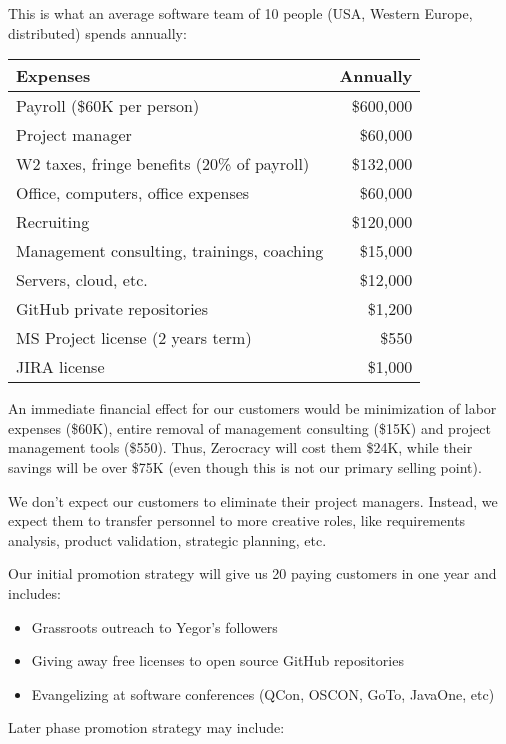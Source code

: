 \documentclass[12pt]{article}
\begin{document}
This is what an average software team of 10 people (USA, Western Europe, distributed) spends annually:

\begin{tabular}{lr}
\hline
Expenses & Annually \\
\hline
Payroll (\$60K per person) & \$600,000 \\
Project manager & \$60,000 \\
W2 taxes, fringe benefits (20\% of payroll) & \$132,000 \\
Office, computers, office expenses & \$60,000 \\
Recruiting & \$120,000 \\
Management consulting, trainings, coaching & \$15,000 \\
Servers, cloud, etc. & \$12,000 \\
GitHub private repositories & \$1,200 \\
MS Project license (2 years term) & \$550 \\
JIRA license & \$1,000 \\
\hline
\end{tabular}

An immediate financial effect for our customers would be minimization of labor
expenses (\$60K), entire removal of management consulting (\$15K) and project
management tools (\$550). Thus, Zerocracy will cost them \$24K, while their
savings will be over \$75K (even though this is not our primary selling point).

We don't expect our customers to eliminate their project managers. Instead, we
expect them to transfer personnel to more creative roles, like requirements
analysis, product validation, strategic planning, etc.

Our initial promotion strategy will give us 20 paying customers in one year and includes:

\begin{itemize}
  \item Grassroots outreach to Yegor's followers
  \item Giving away free licenses to open source GitHub repositories
  \item Evangelizing at software conferences (QCon, OSCON, GoTo, JavaOne, etc)
\end{itemize}

Later phase promotion strategy may include:
\end{document}
